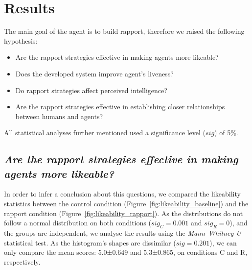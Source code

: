 \section{Results}

The main goal of the agent is to build rapport, therefore we raised the following hypothesis:
\begin{itemize}
	\item Are the rapport strategies effective in making agents more likeable?
	\item Does the developed system improve agent's liveness?
	\item Do rapport strategies affect perceived intelligence?
	\item Are the rapport strategies effective in establishing closer relationships between humans and agents?
\end{itemize}

All statistical analyses further mentioned used a significance level ($sig$) of 5\%.


\subsection*{\textit{Are the rapport strategies effective in making agents more likeable?}}

In order to infer a conclusion about this questions, we compared the likeability statistics between the control condition (Figure~\ref{fig:likeability_baseline}) and the rapport condition (Figure~\ref{fig:likeability_rapport}). As the distributions do not follow a normal distribution on both conditions ($sig_C=0.001$ and $sig_R=0$), and the groups are independent, we analyse the results using the \textit{Mann–Whitney U} statistical test. As the histogram's shapes are dissimilar ($sig=0.201$), we can only compare the mean scores: 5.0±0.649 and 5.3±0.865, on conditions C and R, respectively.

